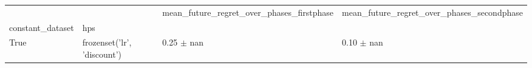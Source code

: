 \begin{tabular}{llll}
\toprule
 &  & mean_future_regret_over_phases_firstphase & mean_future_regret_over_phases_secondphase \\
constant_dataset & hps &  &  \\
\midrule
True & frozenset({'lr', 'discount'}) & 0.25 $\pm$ nan & 0.10 $\pm$ nan \\
\cline{1-4}
\bottomrule
\end{tabular}
